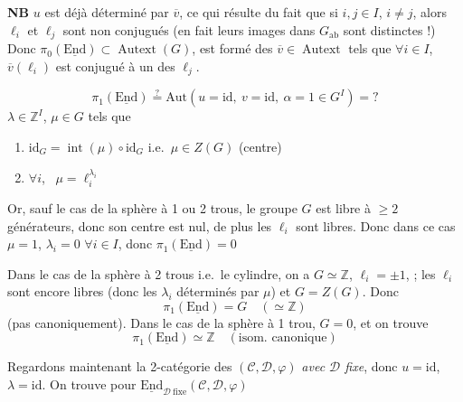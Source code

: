 \documentclass[11pt,a4paper]{article}
\begin{document}
\textbf{NB} \quad $u$ est déjà déterminé par $\overline{v}$, ce qui résulte
du fait que si $i, j \in I$, $i \neq j$, alors $\ell_i$ et $\ell_j$ sont
non conjugués (en fait leurs images dans $G_{\mathrm{ab}}$ sont
distinctes !) Donc $\pi_0(\underline{\mathrm{End}}) \subset
\operatorname{Autext}(G)$, est formé des $\overline{v} \in
\operatorname{Autext}$ tels que $\forall i \in I$, $\overline{v}(\ell_i)$
est conjugué à un des $\ell_j$.


\[
  \pi_1(\underline{\mathrm{End}}) \overset{?}{=}
  \mathrm{Aut}(u = \mathrm{id},\ v = \mathrm{id},\ \alpha = 1 \in G^I) = ?
\]
$\lambda \in \mathbb{Z}^I$, $\mu \in G$ tels que
\begin{enumerate}
  \item[a)] $\mathrm{id}_G = \operatorname{int}(\mu) \circ \mathrm{id}_G$
  i.e.\ $\mu \in Z(G)$ (centre)
  \item[b)] $\forall i$, \ $\mu = \ell_i^{\lambda_i}$
\end{enumerate}

Or, sauf le cas de la sphère à 1 ou 2 trous, le groupe $G$ est libre à
$\geq 2$ générateurs, donc son centre est nul, de plus les $\ell_i$ sont
libres. Donc dans ce cas $\mu = 1$, $\lambda_i = 0$ $\forall i \in I$, donc
$\boxed{\pi_1(\underline{\mathrm{End}}) = 0}$

Dans le cas de la sphère à 2 trous \supplied{(}i.e.\ le cylindre\supplied{)}, on a $G \simeq \mathbb{Z}$,
$\ell_i = \pm 1$, \struck{\ill{}} ; les $\ell_i$ sont encore libres (donc les
$\lambda_i$ déterminés par $\mu$) et $G = Z(G)$. Donc
\[
  \pi_1(\underline{\mathrm{End}}) = G \quad (\simeq \mathbb{Z})
\]
(pas canoniquement). Dans le cas de la sphère à 1 trou, $G = 0$, et on trouve
\[
  \pi_1(\underline{\mathrm{End}}) \simeq \mathbb{Z} \quad
  (\text{isom.\ canonique})
\]


Regardons maintenant la 2-catégorie des $(\mathcal{C}, \mathcal{D},
\varphi)$ \emph{avec $\mathcal{D}$ fixe}, donc $u = \mathrm{id}$,
$\lambda = \mathrm{id}$. On trouve pour
$\underline{\mathrm{End}}_{\mathcal{D}\ \mathrm{fixe}}(\mathcal{C}, \mathcal{D},
\varphi)$
\end{document}

